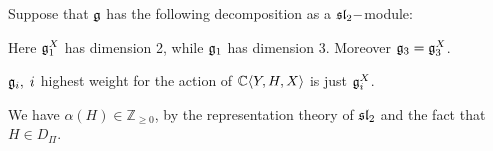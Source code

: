 \begin{itemize}
\begin{dang}
    Suppose that $\mathfrak{g}$ has the following decomposition as a $\mathfrak{sl}_2-$module:
    \begin{center}
    \end{center}
    Here $\mathfrak{g}_1^X$ has dimension 2, while $\mathfrak{g}_1$ has dimension 3. Moreover $\mathfrak{g}_3=\mathfrak{g}_3^X$.
\end{dang}

    \begin{dang}
        \begin{remark}
            $\mathfrak{g}_i,\; i$ highest weight for the action of $\mathbb{C}\langle Y,H,X\rangle$ is just $\mathfrak{g}_i^X$.
        \end{remark}
    \end{dang}

\begin{dang}
    \begin{remark}
        We have $\alpha(H)\in\mathbb{Z}_{\geq0}$, by the representation theory of $\mathfrak{sl}_2$ and the fact that 
        $H\in D_\Pi$.
    \end{remark}
\end{dang}
    

\end{itemize}
